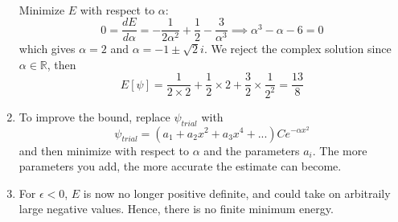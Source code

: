 \documentclass[a4paper]{article}
\begin{document}
\begin{ans}
\begin{enumerate}[label=(\alph*)]
\begin{eqnarray}
\end{eqnarray}
Minimize $E$ with respect to $\alpha$:
$$0=\frac{dE}{d\alpha}=-\frac{1}{2\alpha^2}+\frac{1}{2}-\frac{3}{\alpha^3}\implies\alpha^3-\alpha-6=0$$
which gives $\alpha=2$ and $\alpha=-1\pm\sqrt{2}i$. We reject the complex solution since $\alpha\in\mathbb{R}$, then
$$E[\psi]=\frac{1}{2\times 2}+\frac{1}{2}\times 2+\frac{3}{2}\times\frac{1}{2^2}=\frac{13}{8}$$
\item To improve the bound, replace $\psi_{trial}$ with
$$\psi_{trial}=(a_1+a_2x^2+a_3x^4+...)Ce^{-\alpha x^2}$$
and then minimize with respect to $\alpha$ and the parameters $a_i$. The more parameters you add, the more accurate the estimate can become.
\item For $\epsilon<0$, $E$ is now no longer positive definite, and could take on arbitraily large negative values. Hence, there is no finite minimum energy.
\end{enumerate}
\end{ans}
\newpage
\end{document}
